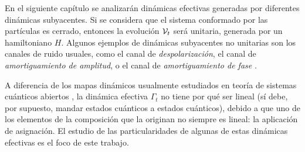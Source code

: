 En el siguiente capítulo se analizarán dinámicas efectivas generadas por diferentes dinámicas subyacentes. Si se considera que el sistema conformado por las partículas es cerrado, entonces la evolución $\mathcal{V}_{t}$ será unitaria, generada por un hamiltoniano $H$. Algunos ejemplos de dinámicas subyacentes no unitarias son los canales de ruido usuales, como el canal de \textit{despolarización}, el canal de \textit{amortiguamiento de amplitud}, o el canal de \textit{amortiguamiento de fase} \cite{Chuang,Wilde}. 



A diferencia de los mapas dinámicos usualmente estudiados en teoría de sistemas cuánticos abiertos \cite{Breuer}, la dinámica efectiva $\Gamma_{t}$ no tiene por qué ser lineal (sí debe, por supuesto, mandar estados cuánticos a estados cuánticos), debido a que uno de los elementos de la composición que la originan no siempre es lineal: la aplicación de asignación. El estudio de las particularidades de algunas de estas dinámicas efectivas es el foco de este trabajo.



